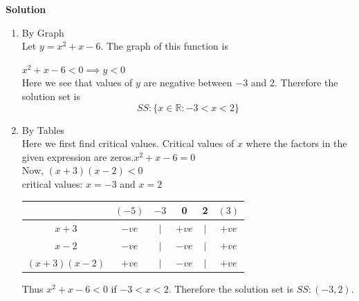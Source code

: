 \documentclass[11pt,a4paper]{article}
\begin{document}
\textbf{Solution}
\begin{enumerate}
\item By Graph\\

Let $y=x^2+x-6$. The graph of this function is 


\begin{figure}[H]
\centering
{}
\end{figure}

$x^2+x-6<0\implies y<0$\\

Here we see that values of $y$ are negative between $-3$ and 2. Therefore the solution set is $$SS: \{x\in \mathbb{R}:-3<x<2\}$$

\item By Tables\\

Here we first find critical values. Critical values of $x$ where the factors in the given expression are zeros.\hspace{0.2cm}$x^2+x-6=0$\\

Now, \hspace{0.2cm}$(x+3)(x-2)<0$\\

critical values: \hspace{0.2cm}$x=-3$ and $x=2$\\



\begin{table}[H]
\centering
\begin{tabular}{cccccc}
& $(-5)$ & $-3$  & 0 & 2& $(3)$\\
\hline
\multicolumn{1}{c|}{$x+3$ } & $-ve$ & $|$ & $+ve$ & $|$  & $+ve$\\
\multicolumn{1}{c|}{$x-2$} & $-ve$  & $|$ & $-ve$ & $|$  & $+ve$\\
\multicolumn{1}{c|}{$(x+3)(x-2)$} & $+ve$ & $|$ & $-ve$  & $|$ & $+ve$\\
\end{tabular}
\end{table}


Thus $x^2+x-6<0$ if $-3<x<2$. Therefore the solution set is $SS:(-3,2)$.\\
\end{enumerate}
\end{document}
